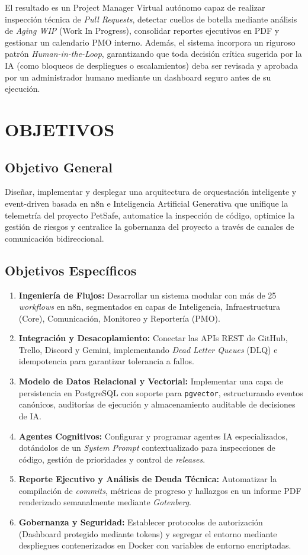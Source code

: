 \documentclass{encabezado}
\begin{document}
El resultado es un Project Manager Virtual autónomo capaz de realizar inspección técnica de \textit{Pull Requests}, detectar cuellos de botella mediante análisis de \textit{Aging WIP} (Work In Progress), consolidar reportes ejecutivos en PDF y gestionar un calendario PMO interno. Además, el sistema incorpora un riguroso patrón \textit{Human-in-the-Loop}, garantizando que toda decisión crítica sugerida por la IA (como bloqueos de despliegues o escalamientos) deba ser revisada y aprobada por un administrador humano mediante un dashboard seguro antes de su ejecución.

\section{OBJETIVOS}

\subsection{Objetivo General}
Diseñar, implementar y desplegar una arquitectura de orquestación inteligente y event-driven basada en n8n e Inteligencia Artificial Generativa que unifique la telemetría del proyecto PetSafe, automatice la inspección de código, optimice la gestión de riesgos y centralice la gobernanza del proyecto a través de canales de comunicación bidireccional.

\subsection{Objetivos Específicos}
\begin{enumerate}
    \item \textbf{Ingeniería de Flujos:} Desarrollar un sistema modular con más de 25 \textit{workflows} en n8n, segmentados en capas de Inteligencia, Infraestructura (Core), Comunicación, Monitoreo y Reportería (PMO).
    \item \textbf{Integración y Desacoplamiento:} Conectar las APIs REST de GitHub, Trello, Discord y Gemini, implementando \textit{Dead Letter Queues} (DLQ) e idempotencia para garantizar tolerancia a fallos.
    \item \textbf{Modelo de Datos Relacional y Vectorial:} Implementar una capa de persistencia en PostgreSQL con soporte para \texttt{pgvector}, estructurando eventos canónicos, auditorías de ejecución y almacenamiento auditable de decisiones de IA.
    \item \textbf{Agentes Cognitivos:} Configurar y programar agentes IA especializados, dotándolos de un \textit{System Prompt} contextualizado para inspecciones de código, gestión de prioridades y control de \textit{releases}.
    \item \textbf{Reporte Ejecutivo y Análisis de Deuda Técnica:} Automatizar la compilación de \textit{commits}, métricas de progreso y hallazgos en un informe PDF renderizado semanalmente mediante \textit{Gotenberg}.
    \item \textbf{Gobernanza y Seguridad:} Establecer protocolos de autorización (Dashboard protegido mediante tokens) y segregar el entorno mediante despliegues contenerizados en Docker con variables de entorno encriptadas.
\end{enumerate}
\end{document}
